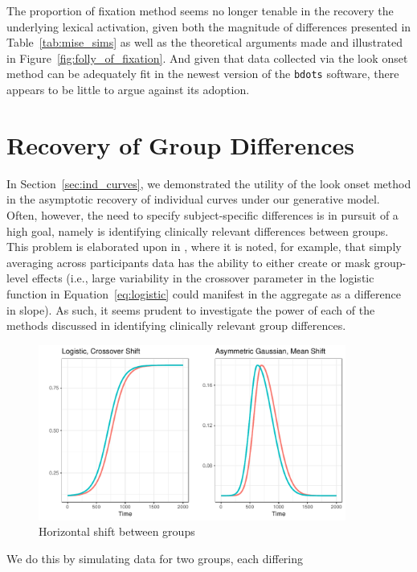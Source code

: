 \documentclass{article}
\newcommand{\xt}{\texttt}
\begin{document}
The proportion of fixation method seems no longer tenable in the recovery the underlying lexical activation, given both the magnitude of differences presented in Table~\ref{tab:mise_sims} as well as the theoretical arguments made and illustrated in Figure~\ref{fig:folly_of_fixation}. And given that data collected via the look onset method can be adequately fit in the newest version of the \xt{bdots} software, there appears to be little to argue against its adoption.


\section{Recovery of Group Differences}

In Section~\ref{sec:ind_curves}, we demonstrated the utility of the look onset method in the asymptotic recovery of individual curves under our generative model. Often, however, the need to specify subject-specific differences is in pursuit of a high goal, namely is identifying clinically relevant differences between groups. This problem is elaborated upon in \citet{mcmurray2010individual}, where it is noted, for example, that simply averaging across participants data has the ability to either create or mask group-level effects (i.e., large variability in the crossover parameter in the logistic function in Equation~\ref{eq:logistic} could manifest in the aggregate as a difference in slope). As such, it seems prudent to investigate the power of each of the methods discussed in identifying  clinically relevant group differences. 

\begin{figure}[H]
\centering
\includegraphics[width=0.9\textwidth]{group_shift.pdf}
\caption{Horizontal shift between groups}
\label{fig:group_shift}
\end{figure}

We do this by simulating data for two groups, each differing 
\end{document}
